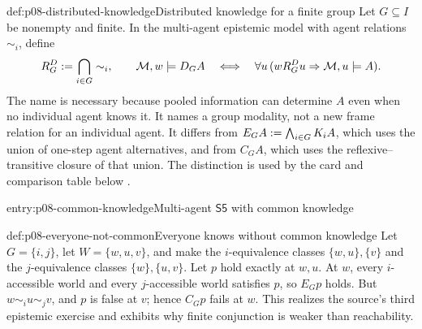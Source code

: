 \begin{hbdefinition}{def:p08-distributed-knowledge}{Distributed knowledge for a finite group}
Let \(G\subseteq I\) be nonempty and finite.  In the multi-agent epistemic
model with agent relations \(\sim_i\), define
\[
 R_G^{D}\mathrel{:=}\bigcap_{i\in G}\sim_i,
 \qquad
 \mathcal M,w\models D_GA
 \quad\Longleftrightarrow\quad
 \forall u\,(wR_G^{D}u\Rightarrow\mathcal M,u\models A).
\]
The name is necessary because pooled information can determine \(A\) even
when no individual agent knows it.  It names a group modality, not a new frame
relation for an individual agent.  It differs from
\(E_GA\mathrel{:=}\bigwedge_{i\in G}K_iA\), which uses the union of one-step agent
alternatives, and from \(C_GA\), which uses the reflexive--transitive closure
of that union.  The distinction is used by the card and comparison table below
\cite{FaginHalpernMosesVardi1995}.
\end{hbdefinition}

\begin{systementry}{entry:p08-common-knowledge}{Multi-agent \(\mathsf{S5}\) with common knowledge}
\end{systementry}

\begin{hbexample}{def:p08-everyone-not-common}{Everyone knows without common knowledge}
Let \(G=\{i,j\}\), let \(W=\{w,u,v\}\), and make the \(i\)-equivalence
classes \(\{w,u\},\{v\}\) and the \(j\)-equivalence classes
\(\{w\},\{u,v\}\).  Let \(p\) hold exactly at \(w,u\).  At \(w\), every
\(i\)-accessible world and every \(j\)-accessible world satisfies \(p\), so
\(E_Gp\) holds.  But \(w\sim_i u\sim_j v\), and \(p\) is false at \(v\);
hence \(C_Gp\) fails at \(w\).  This realizes the source's third epistemic
exercise and exhibits why finite conjunction is weaker than reachability.
\end{hbexample}

